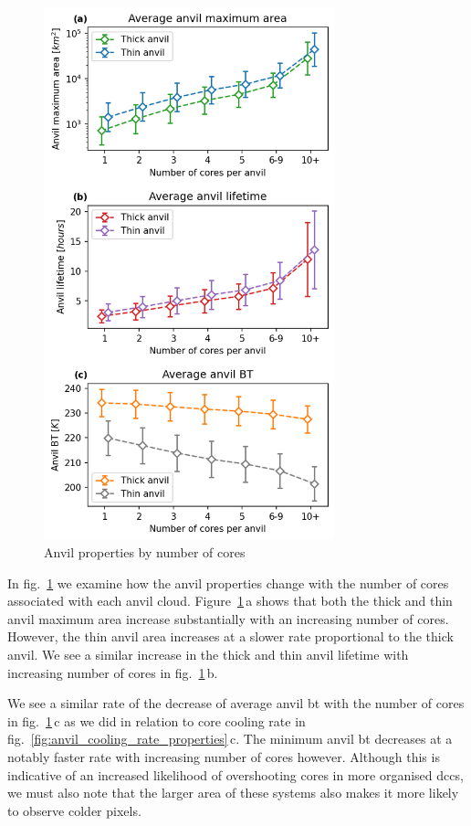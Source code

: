 \begin{figure}[tp]
    \centering
    \includegraphics[width=0.75\textwidth]{figures/ch2_24.png}
    \caption{Anvil properties by number of cores}
    \label{fig:anvil_number_of_cores_properties}
\end{figure}

In fig.~\ref{fig:anvil_number_of_cores_properties} we examine how the anvil properties change with the number of cores associated with each anvil cloud.
Figure~\ref{fig:anvil_number_of_cores_properties}\,a shows that both the thick and thin anvil maximum area increase substantially with an increasing number of cores.
However, the thin anvil area increases at a slower rate proportional to the thick anvil.
We see a similar increase in the thick and thin anvil lifetime with increasing number of cores in fig.~\ref{fig:anvil_number_of_cores_properties}\,b.

We see a similar rate of the decrease of average anvil \acrshort{bt} with the number of cores in fig.~\ref{fig:anvil_number_of_cores_properties}\,c as we did in relation to core cooling rate in fig.~\ref{fig:anvil_cooling_rate_properties}\,c.
The minimum anvil \acrshort{bt} decreases at a notably faster rate with increasing number of cores however.
Although this is indicative of an increased likelihood of overshooting cores in more organised \acrshort{dcc}s, we must also note that the larger area of these systems also makes it more likely to observe colder pixels.

